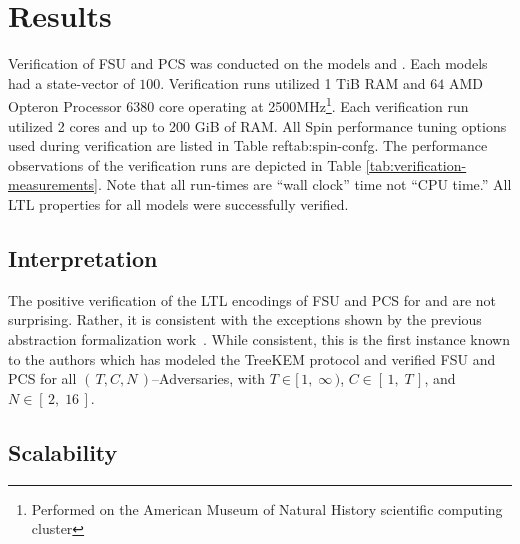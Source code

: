 \documentclass[runningheads]{llncs}
\newcommand{\Abrev}[1]{\gls{#1}}
\newcommand{\NumericRange}[2]{\ensuremath{\left[\,#1,\; #2\,\right]}\xspace}
\newcommand{\NumericRangeOpenR}[2]{\ensuremath{[\,#1,\; #2\,)}\xspace}
\begin{document}
\section{Results}

Verification of  \Abrev{FSU} and \Abrev{PCS} was conducted on the models  and .
Each models had a state-vector of $100$\siBytes.
Verification runs utilized 1 TiB RAM and \(64\) AMD Opteron Processor 6380 core operating at 2500MHz\footnote{Performed on the American Museum of Natural History scientific computing cluster}.
Each verification run utilized 2 cores and up to 200 GiB of RAM.
All Spin performance tuning options used during verification are listed in Table ref{tab:spin-confg}.
The performance observations of the verification runs are depicted in Table \ref{tab:verification-measurements}.
Note that all run-times are ``wall clock'' time not ``CPU time.''
All \Abrev{LTL} properties for all models were successfully verified.

\subsection{Interpretation}

The positive verification of the LTL encodings of  \Abrev{FSU} and \Abrev{PCS} for   and  are not surprising.
Rather, it is consistent with the exceptions shown by the previous \CGKAdef abstraction formalization work~\cite{alwen2020security}.
While consistent, this is the first instance known to the authors which has modeled the TreeKEM protocol and verified \Abrev{FSU} and \Abrev{PCS} for all $(\,T, C, N\,)$--Adversaries, with $T \in \NumericRangeOpenR{1}{\infty}$, $C \in \NumericRange{1}{T}$, and $N \in \NumericRange{2}{16}$.

\subsection{Scalability}
\end{document}
